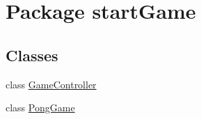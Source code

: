 \hypertarget{namespacestart_game}{}\section{Package start\+Game}
\label{namespacestart_game}
\subsection*{Classes}
\begin{DoxyCompactItemize}
\item 
class \hyperlink{classstart_game_1_1_game_controller}{Game\+Controller}
\item 
class \hyperlink{classstart_game_1_1_pong_game}{Pong\+Game}
\end{DoxyCompactItemize}

